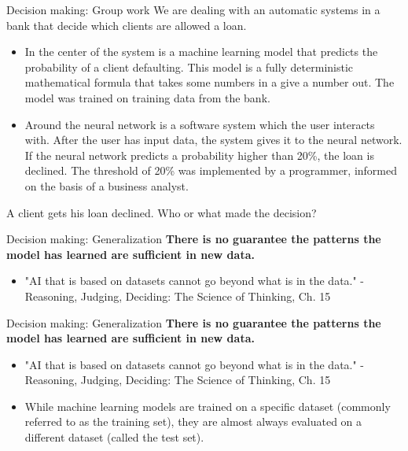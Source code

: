\documentclass[8pt]{beamer}
\begin{document}
	\begin{frame}{Decision making: Group work}
		We are dealing with an automatic systems in a bank that decide which clients are allowed a loan.
		\begin{itemize}
			\item In the center of the system is a machine learning model that predicts the probability of a client defaulting. This model is a fully deterministic mathematical formula that takes some numbers in a give a number out. The model was trained on training data from the bank.
			\item Around the neural network is a software system which the user interacts with. After the user has input data, the system gives it to the neural network. If the neural network predicts a probability higher than 20\%, the loan is declined. The threshold of 20\% was implemented by a programmer, informed on the basis of a business analyst.
		\end{itemize}
		A client gets his loan declined. Who or what made the decision?
	\end{frame}

	\begin{frame}[t]{Decision making: Generalization} %
		\centering
		\textbf{There is no guarantee the patterns the model has learned are sufficient in new data.}
		\begin{itemize}
			\item "AI that is based on datasets cannot go beyond what is in the data." - Reasoning, Judging, Deciding: The Science of Thinking, Ch. 15
		\end{itemize}
		\vspace{0.5cm}
	\end{frame}

	\begin{frame}[t]{Decision making: Generalization} %
		\centering
		\textbf{There is no guarantee the patterns the model has learned are sufficient in new data.}
		\begin{itemize}
			\item "AI that is based on datasets cannot go beyond what is in the data." - Reasoning, Judging, Deciding: The Science of Thinking, Ch. 15
			\item While machine learning models are trained on a specific dataset (commonly referred to as the training set), they are almost always evaluated on a different dataset (called the test set).
		\end{itemize}
	\end{frame}
\end{document}
